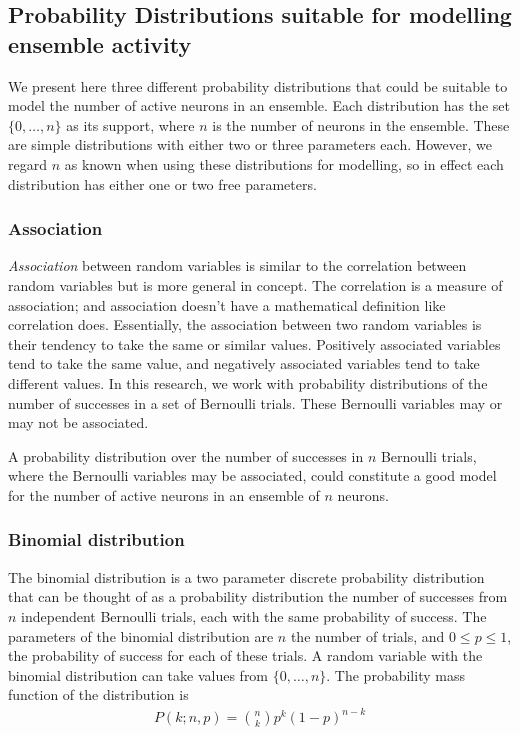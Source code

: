     \subsection{Probability Distributions suitable for modelling ensemble activity}

    We present here three different probability distributions that could be suitable to model the number of active neurons in an ensemble. Each distribution has the set $\lbrace 0, \dots, n \rbrace$ as its support, where $n$ is the number of neurons in the ensemble. These are simple distributions with either two or three parameters each. However, we regard $n$ as known when using these distributions for modelling, so in effect each distribution has either one or two free parameters.

      \subsubsection{Association}\label{sec:association}
      \textit{Association} between random variables is similar to the correlation between random variables but is more general in concept. The correlation is a measure of association; and association doesn't have a mathematical definition like correlation does. Essentially, the association between two random variables is their tendency to take the same or similar values. Positively associated variables tend to take the same value, and negatively associated variables tend to take different values. In this research, we work with probability distributions of the number of successes in a set of Bernoulli trials. These Bernoulli variables may or may not be associated.

      A probability distribution over the number of successes in $n$ Bernoulli trials, where the Bernoulli variables may be associated, could constitute a good model for the number of active neurons in an ensemble of $n$ neurons.

      \subsubsection{Binomial distribution}
      The binomial distribution is a two parameter discrete probability distribution that can be thought of as a probability distribution the number of successes from $n$ independent Bernoulli trials, each with the same probability of success. The parameters of the binomial distribution are $n$ the number of trials, and $0 \leq p \leq 1$, the probability of success for each of these trials. A random variable with the binomial distribution can take values from $\lbrace 0, \dots, n \rbrace$. The probability mass function of the distribution is
      \begin{align}\label{eq:binomial_pmf}
        P(k;n,p) = \binom{n}{k} p^k (1-p)^{n-k}
      \end{align}

